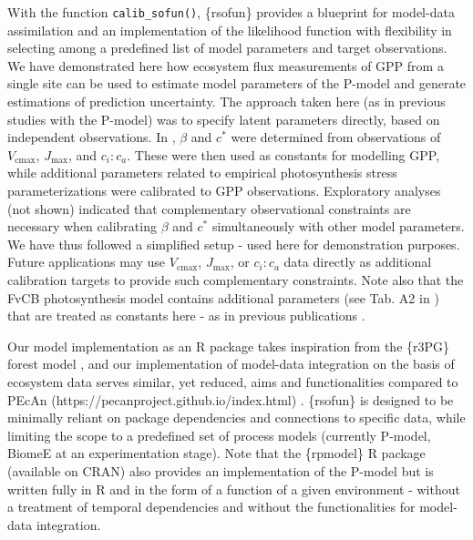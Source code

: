 \documentclass[gmd, manuscript]{copernicus}
\begin{document}
With the function \texttt{calib\_sofun()}, \{rsofun\} provides a blueprint for model-data assimilation and an implementation of the likelihood function with flexibility in selecting among a predefined list of model parameters and target observations. We have demonstrated here how ecosystem flux measurements of GPP from a single site can be used to estimate model parameters of the P-model and generate estimations of prediction uncertainty. The approach taken here (as in previous studies with the P-model) was to specify latent parameters directly, based on independent observations. In \citet{wang2017}, $\beta$ and $c^*$ were determined from observations of $V_{\mathrm{cmax}}$, $J_{\mathrm{max}}$, and $c_i:c_a$. These were then used as constants for modelling GPP, while additional parameters related to empirical photosynthesis stress parameterizations were calibrated to GPP observations. Exploratory analyses (not shown) indicated that complementary observational constraints are necessary when calibrating $\beta$ and $c^*$ simultaneously with other model parameters. We have thus followed a simplified setup - used here for demonstration purposes. Future applications may use $V_{\mathrm{cmax}}$, $J_{\mathrm{max}}$, or $c_i:c_a$ data directly as additional calibration targets to provide such complementary constraints. Note also that the FvCB photosynthesis model contains additional parameters (see Tab. A2 in \citep{stocker2020}) that are treated as constants here - as in previous publications \citep{bloomfield2023, mengoli2022, stocker2020, tan2021, wang2017}.

Our model implementation as an R package takes inspiration from the \{r3PG\} forest model \citep{trotsiuk2020}, and our implementation of model-data integration on the basis of ecosystem data serves similar, yet reduced, aims and functionalities compared to PEcAn (https://pecanproject.github.io/index.html) \citep{lebauer2013}. \{rsofun\} is designed to be minimally reliant on package dependencies and connections to specific data, while limiting the scope to a predefined set of process models (currently P-model, BiomeE at an experimentation stage). Note that the \{rpmodel\} R package (available on CRAN) also provides an implementation of the P-model but is written fully in R and in the form of a function of a given environment - without a treatment of temporal dependencies and without the functionalities for model-data integration.

\conclusions  %
\end{document}

